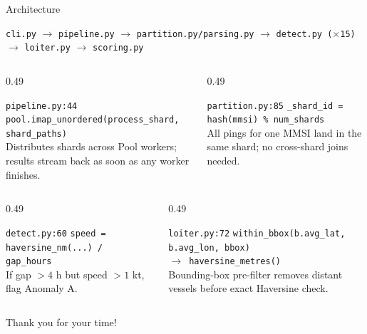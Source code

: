 \documentclass[10pt]{beamer}
\begin{document}
\begin{frame}[t]{Architecture}

\begin{center}
\scriptsize
\texttt{cli.py} \(\rightarrow\)
\texttt{pipeline.py} \(\rightarrow\)
\texttt{partition.py/parsing.py} \(\rightarrow\)
\texttt{detect.py (\(\times\)15)} \(\rightarrow\)
\texttt{loiter.py} \(\rightarrow\)
\texttt{scoring.py}
\end{center}

\vspace{4pt}

\begin{columns}[T,onlytextwidth]
  \begin{column}{0.49\textwidth}
    \begin{block}{\texttt{pipeline.py:44}}
      \scriptsize\texttt{pool.imap\_unordered(process\_shard, shard\_paths)}\\[3pt]
      \footnotesize Distributes shards across Pool workers; results stream back as soon as any worker finishes.
    \end{block}
  \end{column}

  \begin{column}{0.49\textwidth}
    \begin{block}{\texttt{partition.py:85}}
      \scriptsize\texttt{\_shard\_id = hash(mmsi) \% num\_shards}\\[3pt]
      \footnotesize All pings for one MMSI land in the same shard; no cross-shard joins needed.
    \end{block}
  \end{column}
\end{columns}

\vspace{3pt}

\begin{columns}[T,onlytextwidth]
  \begin{column}{0.49\textwidth}
    \begin{block}{\texttt{detect.py:60}}
      \scriptsize\texttt{speed = haversine\_nm(...) / gap\_hours}\\[3pt]
      \footnotesize If gap \(> 4\) h but speed \(> 1\) kt, flag Anomaly A.
    \end{block}
  \end{column}

  \begin{column}{0.49\textwidth}
    \begin{block}{\texttt{loiter.py:72}}
      \scriptsize\texttt{within\_bbox(b.avg\_lat, b.avg\_lon, bbox)}\\
      \scriptsize\texttt{\(\rightarrow\) haversine\_metres()}\\[3pt]
      \footnotesize Bounding-box pre-filter removes distant vessels before exact Haversine check.
    \end{block}
  \end{column}
\end{columns}

\end{frame}

\begin{frame}
\textcolor{myNewColorA}{\Huge{\centerline{Thank you for your time!}}}
\end{frame}

\end{document}
